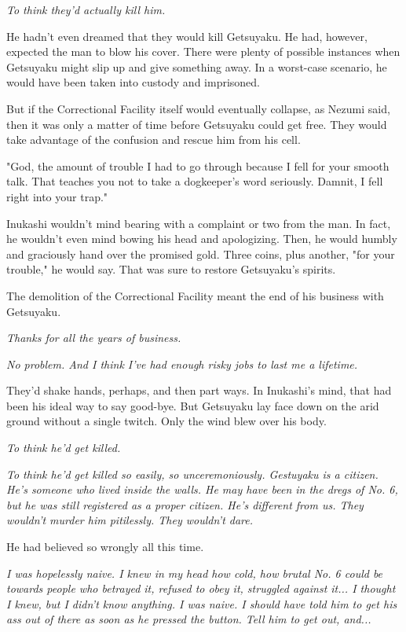 \emph{To think they'd actually kill him.}

He hadn't even dreamed that they would kill Getsuyaku. He had, however,
expected the man to blow his cover. There were plenty of possible
instances when Getsuyaku might slip up and give something away. In a
worst-case scenario, he would have been taken into custody and
imprisoned.

But if the Correctional Facility itself would eventually collapse, as
Nezumi said, then it was only a matter of time before Getsuyaku could
get free. They would take advantage of the confusion and rescue him from
his cell.

"God, the amount of trouble I had to go through because I fell for your
smooth talk. That teaches you not to take a dogkeeper's word seriously.
Damnit, I fell right into your trap."

Inukashi wouldn't mind bearing with a complaint or two from the man. In
fact, he wouldn't even mind bowing his head and apologizing. Then, he
would humbly and graciously hand over the promised gold. Three coins,
plus another, "for your trouble," he would say. That was sure to restore
Getsuyaku's spirits.

The demolition of the Correctional Facility meant the end of his
business with Getsuyaku.

\emph{Thanks for all the years of business.}

\emph{No problem. And I think I've had enough risky jobs to last me a
lifetime.}

They'd shake hands, perhaps, and then part ways. In Inukashi's mind,
that had been his ideal way to say good-bye. But Getsuyaku lay face down
on the arid ground without a single twitch. Only the wind blew over his
body.

\emph{To think he'd get killed.}

\emph{To think he'd get killed so easily, so unceremoniously. Gestuyaku is a
citizen. He's someone who lived inside the walls. He may have been in
the dregs of No. 6, but he was still registered as a proper citizen.
He's different from us. They wouldn't murder him pitilessly. They wouldn't dare.}

He had believed so wrongly all this time.

\emph{I was hopelessly naive. I knew in my head how cold, how brutal No. 6
could be towards people who betrayed it, refused to obey it, struggled
against it... I thought I knew, but I didn't know anything. I was naive.
I should have told him to get his ass out of there as soon as he pressed
the button. Tell him to get out, and...}

